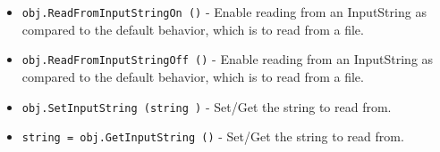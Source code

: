 \begin{itemize}
\item  \verb|obj.ReadFromInputStringOn ()| -  Enable reading from an InputString as compared to the default
 behavior, which is to read from a file.

\item  \verb|obj.ReadFromInputStringOff ()| -  Enable reading from an InputString as compared to the default
 behavior, which is to read from a file.

\item  \verb|obj.SetInputString (string )| -  Set/Get the string to read from.

\item  \verb|string = obj.GetInputString ()| -  Set/Get the string to read from.

\end{itemize}
